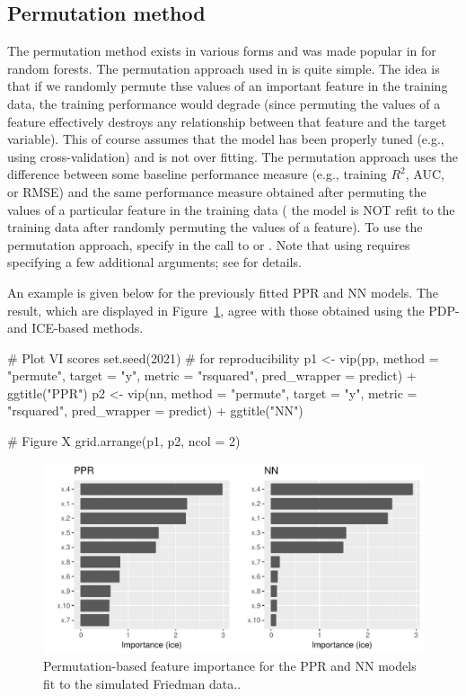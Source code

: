 \subsection{Permutation method}

The permutation method exists in various forms and was made popular in \citet{random-breiman-2001} for random forests. The permutation approach used in  is quite simple. The idea is that if we randomly permute thse values of an important feature in the training data, the training performance would degrade (since permuting the values of a feature effectively destroys any relationship between that feature and the target variable). This of course assumes that the model has been properly tuned (e.g., using cross-validation) and is not over fitting. The permutation approach uses the difference between some baseline performance measure (e.g., training $R^2$, AUC, or RMSE) and the same performance measure obtained after permuting the values of a particular feature in the training data ( the model is NOT refit to the training data after randomly permuting the values of a feature). To use the permutation approach, specify  in the call to  or . Note that using  requires specifying a few additional arguments; see  for details.

An example is given below for the previously fitted PPR and NN models. The result, which are displayed in Figure~\ref{fig:vip-permute-ppr-nn}, agree with those obtained using the PDP- and ICE-based methods.

\begin{example}
# Plot VI scores
set.seed(2021)  # for reproducibility
p1 <- vip(pp, method = "permute", target = "y", metric = "rsquared",
          pred_wrapper = predict) + ggtitle("PPR")
p2 <- vip(nn, method = "permute", target = "y", metric = "rsquared",
          pred_wrapper = predict) + ggtitle("NN")

# Figure X
grid.arrange(p1, p2, ncol = 2)
\end{example}

\begin{figure}[!htb]
  \centering 
  \includegraphics[width=1\linewidth]{figures/vip-ice-ppr-nn} 
  \caption{Permutation-based feature importance for the PPR and NN models fit to the simulated Friedman data..}
  \label{fig:vip-permute-ppr-nn}
\end{figure}

